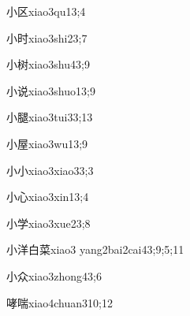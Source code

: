 \begin{verbete}{小区}{xiao3qu1}{3;4}
\end{verbete}

\begin{verbete}{小时}{xiao3shi2}{3;7}
\end{verbete}

\begin{verbete}{小树}{xiao3shu4}{3;9}
\end{verbete}

\begin{verbete}{小说}{xiao3shuo1}{3;9}
\end{verbete}

\begin{verbete}{小腿}{xiao3tui3}{3;13}
\end{verbete}

\begin{verbete}{小屋}{xiao3wu1}{3;9}
\end{verbete}

\begin{verbete}{小小}{xiao3xiao3}{3;3}
\end{verbete}

\begin{verbete}{小心}{xiao3xin1}{3;4}
\end{verbete}

\begin{verbete}{小学}{xiao3xue2}{3;8}
\end{verbete}

\begin{verbete}{小洋白菜}{xiao3 yang2bai2cai4}{3;9;5;11}
\end{verbete}

\begin{verbete}{小众}{xiao3zhong4}{3;6}
\end{verbete}

\begin{verbete}{哮喘}{xiao4chuan3}{10;12}
\end{verbete}

